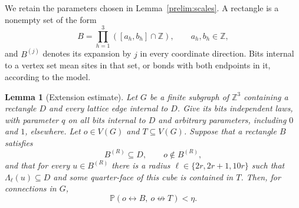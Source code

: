 \documentclass[11pt]{article}
\newtheorem{lemma}[theorem]{Lemma}
\theoremstyle{definition}
\theoremstyle{remark}
\numberwithin{equation}{section}
\begin{document}
We retain the parameters chosen in Lemma~\ref{prelim:scales}.
A rectangle is a nonempty set of the form
\[
 B=\prod_{h=1}^3([a_h,b_h]\cap\mathbb Z),
 \qquad a_h,b_h\in\mathbb Z,
\]
and $B^{(j)}$ denotes its expansion by $j$ in every coordinate direction.
Bits internal to a vertex set mean sites in that set, or bonds with both
endpoints in it, according to the model.

\begin{lemma}[Extension estimate]
\label{ext:estimate}
Let $G$ be a finite subgraph of $\mathbb Z^3$ containing a rectangle $D$
and every lattice edge internal to $D$.
Give its bits independent laws, with parameter $q$ on all bits internal
to $D$ and arbitrary parameters, including $0$ and $1$, elsewhere.
Let $o\in V(G)$ and $T\subseteq V(G)$.
Suppose that a rectangle $B$ satisfies
\[
 B^{(R)}\subseteq D,
 \qquad o\notin B^{(R)},
\]
and that for every $u\in B^{(R)}$ there is a radius
$\ell\in\{2r,2r+1,10r\}$ such that $\Lambda_\ell(u)\subseteq D$
and some quarter-face of this cube is contained in $T$.
Then, for connections in $G$,
\begin{equation}
 \mathbb P(o\leftrightarrow B,\ o\not\leftrightarrow T)<\eta.
 \label{ext:conclusion}
\end{equation}
\end{lemma}
\end{document}
